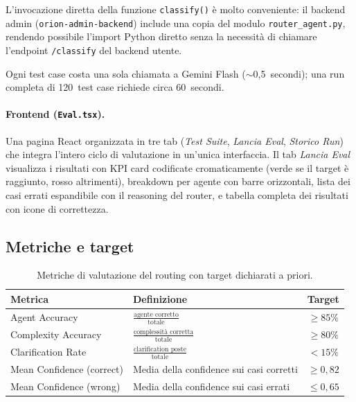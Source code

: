 L'invocazione diretta della funzione \texttt{classify()} è molto conveniente: 
il backend admin (\texttt{orion-admin-backend}) include una copia del modulo \texttt{router\_agent.py}, 
rendendo possibile l'import Python diretto senza la necessità di chiamare l'endpoint \texttt{/classify} del backend utente. 

Ogni test case costa una sola chiamata a Gemini Flash ($\sim$0,5~secondi); una run completa di 120~test case richiede circa 60~secondi.

\paragraph{Frontend (\texttt{Eval.tsx}).} Una pagina React organizzata in tre tab (\emph{Test Suite}, \emph{Lancia Eval}, \emph{Storico Run}) 
che integra l'intero ciclo di valutazione in un'unica interfaccia. Il tab \emph{Lancia Eval} visualizza i risultati con KPI card codificate cromaticamente 
(verde se il target è raggiunto, rosso altrimenti), breakdown per agente con barre orizzontali, 
lista dei casi errati espandibile con il reasoning del router, e tabella completa dei risultati con icone di correttezza.

\subsection{Metriche e target}
\label{subsec:eval-metriche}


\begin{table}[htbp]
  \centering
  \caption[Metriche di valutazione e target]{Metriche di valutazione del routing con target dichiarati a priori.}
  \label{tab:eval-metriche}
  \begin{tabular}{llc}
    \toprule
    \textbf{Metrica}                  & \textbf{Definizione}                              & \textbf{Target} \\
    \midrule
    Agent Accuracy                    & $\frac{\text{agente corretto}}{\text{totale}}$     & $\geq 85\%$ \\[3pt]
    Complexity Accuracy               & $\frac{\text{complessità corretta}}{\text{totale}}$ & $\geq 80\%$ \\[3pt]
    Clarification Rate                & $\frac{\text{clarification poste}}{\text{totale}}$  & $< 15\%$ \\[3pt]
    Mean Confidence (correct)         & Media della confidence sui casi corretti            & $\geq 0{,}82$ \\[3pt]
    Mean Confidence (wrong)           & Media della confidence sui casi errati              & $\leq 0{,}65$ \\
    \bottomrule
  \end{tabular}
\end{table}

